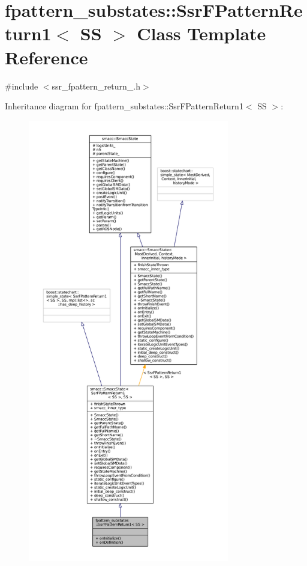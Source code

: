 \hypertarget{structfpattern__substates_1_1SsrFPatternReturn1}{}\section{fpattern\+\_\+substates\+:\+:Ssr\+F\+Pattern\+Return1$<$ SS $>$ Class Template Reference}
\label{structfpattern__substates_1_1SsrFPatternReturn1}


{\ttfamily \#include $<$ssr\+\_\+fpattern\+\_\+return\+\_.\+h$>$}



Inheritance diagram for fpattern\+\_\+substates\+:\+:Ssr\+F\+Pattern\+Return1$<$ SS $>$\+:
\nopagebreak
\begin{figure}[H]
\begin{center}
\leavevmode
\includegraphics[height=550pt]{structfpattern__substates_1_1SsrFPatternReturn1__inherit__graph}
\end{center}
\end{figure}



